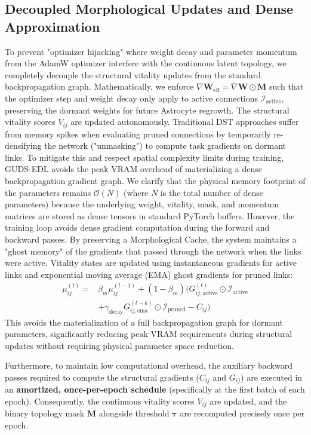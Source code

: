 \documentclass[letterpaper]{article} %
\begin{document}
\subsection{Decoupled Morphological Updates and Dense Approximation}
To prevent "optimizer hijacking" where weight decay and parameter momentum from the AdamW optimizer interfere with the continuous latent topology, we completely decouple the structural vitality updates from the standard backpropagation graph. Mathematically, we enforce $\nabla \bm{W}_{\text{eff}} = \nabla \bm{W} \odot \bm{M}$ such that the optimizer step and weight decay only apply to active connections $\mathcal{I}_{\text{active}}$, preserving the dormant weights for future Astrocyte regrowth. The structural vitality scores $V_{ij}$ are updated autonomously. Traditional DST approaches suffer from memory spikes when evaluating pruned connections by temporarily re-densifying the network ("unmasking") to compute task gradients on dormant links. To mitigate this and respect spatial complexity limits during training, GUDS-EDL avoids the peak VRAM overhead of materializing a dense backpropagation gradient graph. We clarify that the physical memory footprint of the parameters remains $\mathcal{O}(N)$ (where $N$ is the total number of dense parameters) because the underlying weight, vitality, mask, and momentum matrices are stored as dense tensors in standard PyTorch buffers. However, the training loop avoids dense gradient computation during the forward and backward passes. By preserving a Morphological Cache, the system maintains a "ghost memory" of the gradients that passed through the network when the links were active. Vitality states are updated using instantaneous gradients for active links and exponential moving average (EMA) ghost gradients for pruned links:
\begin{equation}
\begin{aligned}
    \mu_{ij}^{(t)} ={}& \beta_m \mu_{ij}^{(t-1)} + (1-\beta_m) \Big(
    G_{ij, \text{active}}^{(t)} \odot \mathcal{I}_{\text{active}} \\
    &+ \gamma_{\text{decay}} G_{ij, \text{ema}}^{(t-k)} \odot
    \mathcal{I}_{\text{pruned}} - C_{ij} \Big)
\end{aligned}
\end{equation}
This avoids the materialization of a full backpropagation graph for dormant parameters, significantly reducing peak VRAM requirements during structural updates without requiring physical parameter space reduction.

Furthermore, to maintain low computational overhead, the auxiliary backward passes required to compute the structural gradients ($C_{ij}$ and $G_{ij}$) are executed in an \textbf{amortized, once-per-epoch schedule} (specifically at the first batch of each epoch). Consequently, the continuous vitality scores $V_{ij}$ are updated, and the binary topology mask $\bm{M}$ alongside threshold $\bm{\tau}$ are recomputed precisely once per epoch. 
\end{document}
